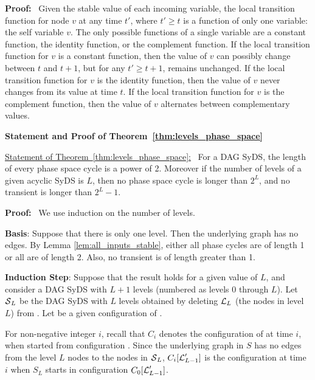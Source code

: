 \medskip

\noindent
\textbf{Proof:}~
Given the stable value of each incoming variable, the local transition
function for node $v$ at any time $t'$, where $t' \geq t$ is a
function of only one variable: the self variable $v$.  The only
possible functions of a single variable are a constant function,
the identity function, or the complement function.  If the local
transition function for $v$ is a constant function, then the value
of $v$ can possibly change between $t$ and $t+1$, but for any $t'
\geq t+1$, remains unchanged.  If the local transition function for
$v$ is the identity function, then the value of $v$ never changes
from its value at time $t$.  If the local transition function for
$v$ is the complement function, then the value of $v$ alternates
between complementary values.  \QED

\medskip

\noindent
\textbf{Statement and Proof of Theorem~\ref{thm:levels_phase_space}}

\medskip

\underline{Statement of Theorem~\ref{thm:levels_phase_space}:}~
For a DAG SyDS,
the length of every phase space cycle is a power of 2.
Moreover if the number of levels of a given acyclic SyDS is $L$,
then no phase space cycle is longer than $2^L$,
and no transient is longer than $2^L-1$.

\noindent
\textbf{Proof:}~ We use induction on the number of levels.

\smallskip

\noindent
{\bf Basis}: Suppose that there is only one level.
Then the underlying  graph has no edges.
By Lemma \ref{lem:all_inputs_stable},
either all phase cycles are of length 1 or all are of length 2. 
Also, no transient is of length greater than 1.

\smallskip

\noindent
{\bf Induction Step}: Suppose that the result holds for a given value of $L$,
and consider a DAG SyDS \cals{} with $L+1$ levels (numbered as levels 0 through $L$).
Let $\mbox{$\mathcal{S}$}_L$ be the DAG SyDS with $L$ levels obtained 
by deleting $\mbox{$\mathcal{L}$}_L$ (the nodes in level $L$) from \cals{}.
Let \calc{} be a given configuration of \cals{}.

\smallskip

For non-negative integer $i$, 
recall that $C_i$ denotes the configuration of \cals{} at time $i$, 
when started from configuration \calc{}.
Since the underlying graph in $S$ has 
no edges from the level $L$ nodes to the nodes in $\mbox{$\mathcal{S}$}_L$,
$C_i[\mbox{$\mathcal{L}$}_{L-1}']$ is the configuration at time $i$ 
when $S_L$ starts in configuration $C_0[\mbox{$\mathcal{L}$}_{L-1}']$.

